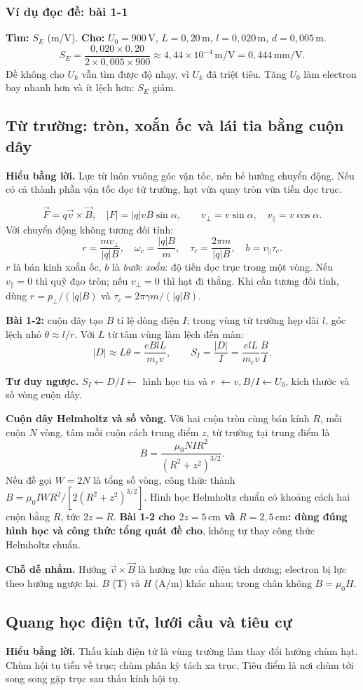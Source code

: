 \documentclass[11pt,a4paper]{article}
\newcommand{\unit}[1]{\,\mathrm{#1}}
\newcommand{\idea}[1]{\par\textbf{Hiểu bằng lời.} #1\par}
\newcommand{\think}[1]{\par\textbf{Tư duy ngược.} #1\par}
\newcommand{\trap}[1]{\par\textbf{Chỗ dễ nhầm.} #1\par}
\newcommand{\ex}[1]{\subsubsection*{Ví dụ đọc đề: #1}}
\begin{document}
\ex{bài 1-1}
\textbf{Tìm:} $S_E$ (m/V). \textbf{Cho:}
$U_0=900\unit V$, $L=0{,}20\unit m$, $l=0{,}020\unit m$, $d=0{,}005\unit m$.
\[
S_E=\frac{0{,}020\times0{,}20}{2\times0{,}005\times900}
\approx4{,}44\times10^{-4}\unit{m/V}=0{,}444\unit{mm/V}.
\]
Đề không cho $U_k$ vẫn tìm được độ nhạy, vì $U_k$ đã triệt tiêu.
Tăng $U_0$ làm electron bay nhanh hơn và ít lệch hơn: $S_E$ giảm.

\subsection{Từ trường: tròn, xoắn ốc và lái tia bằng cuộn dây}\label{sec:magnetic}
\idea{Lực từ luôn vuông góc vận tốc, nên bẻ hướng chuyển động.
Nếu có cả thành phần vận tốc dọc từ trường, hạt vừa quay tròn vừa tiến dọc trục.}
\[
\vec F=q\vec v\times\vec B,\quad |F|=|q|vB\sin\alpha,
\qquad v_\perp=v\sin\alpha,\quad v_\parallel=v\cos\alpha.
\]
Với chuyển động không tương đối tính:
\[
r=\frac{mv_\perp}{|q|B},\quad
\omega_c=\frac{|q|B}{m},\quad
\tau_c=\frac{2\pi m}{|q|B},\quad
b=v_\parallel\tau_c.
\]
$r$ là bán kính xoắn ốc, $b$ là \emph{bước xoắn}: độ tiến dọc trục trong một vòng.
Nếu $v_\parallel=0$ thì quỹ đạo tròn; nếu $v_\perp=0$ thì hạt đi thẳng.
Khi cần tương đối tính, dùng $r=p_\perp/(|q|B)$ và
$\tau_c=2\pi\gamma m/(|q|B)$.

\textbf{Bài 1-2:} cuộn dây tạo $B$ tỉ lệ dòng điện $I$; trong vùng từ trường
hẹp dài $l$, góc lệch nhỏ $\theta\approx l/r$.
Với $L$ từ tâm vùng làm lệch đến màn:
\[
|D|\approx L\theta=\frac{eBlL}{m_ev},\qquad
S_I=\frac{|D|}{I}=\frac{elL}{m_ev}\frac BI.
\]
\think{$S_I\leftarrow D/I\leftarrow$ hình học tia và $r$
$\leftarrow v,B/I\leftarrow U_0$, kích thước và số vòng cuộn dây.}

\textbf{Cuộn dây Helmholtz và số vòng.}
Với hai cuộn tròn cùng bán kính $R$, mỗi cuộn $N$ vòng,
tâm mỗi cuộn cách trung điểm $z$, từ trường tại trung điểm là
\[
B=\frac{\mu_0NI R^2}{(R^2+z^2)^{3/2}}.
\]
Nếu đề gọi $W=2N$ là tổng số vòng, công thức thành
$B=\mu_0 IW R^2/[2(R^2+z^2)^{3/2}]$.
Hình học Helmholtz chuẩn có khoảng cách hai cuộn bằng $R$, tức $2z=R$.
\textbf{Bài 1-2 cho $2z=5\unit{cm}$ và $R=2{,}5\unit{cm}$: dùng đúng hình học
và công thức tổng quát đề cho}, không tự thay công thức Helmholtz chuẩn.

\trap{Hướng $\vec v\times\vec B$ là hướng lực của điện tích dương;
electron bị lực theo hướng ngược lại. $B$ (T) và $H$ (A/m) khác nhau;
trong chân không $B=\mu_0H$.}

\subsection{Quang học điện tử, lưới cầu và tiêu cự}\label{sec:lens}
\idea{Thấu kính điện tử là vùng trường làm thay đổi hướng chùm hạt.
Chùm hội tụ tiến về trục; chùm phân kỳ tách xa trục.
Tiêu điểm là nơi chùm tới song song gặp trục sau thấu kính hội tụ.}
\end{document}
